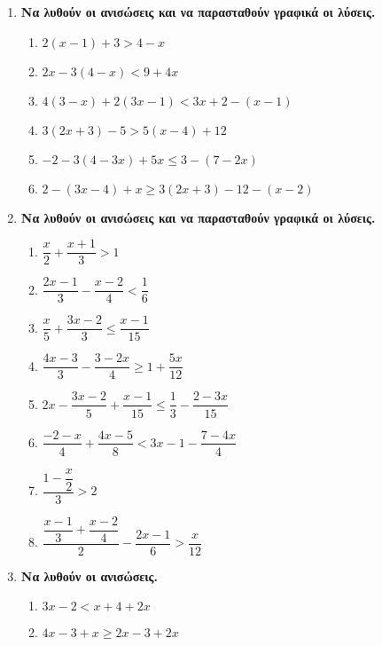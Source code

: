 \documentclass[twoside,nofonts,internet]{askhseis}
\begin{document}
\begin{enumerate}[label=\bf\textcolor{black}{{\large \arabic*.}},
itemsep=5mm]
\begin{multicols}{3}
\begin{enumerate}[label=\roman*.]
\item $ -x-4\geq7-3x+2 $
\item $ 7x-3+x<2x+9+5x $
\item $ -3x+8>4-5x+12 $
\end{enumerate}
\end{multicols}
\item \textbf{Να λυθούν οι ανισώσεις και να παρασταθούν γραφικά οι λύσεις.}
\begin{multicols}{2}
\begin{enumerate}[label=\roman*.]
\item $ 2(x-1)+3>4-x $
\item $ 2x-3(4-x)<9+4x $
\item $ 4(3-x)+2(3x-1)<3x+2-(x-1) $
\item $ 3(2x+3)-5>5(x-4)+12 $
\item $ -2-3(4-3x)+5x\leq3-(7-2x) $
\item $ 2-(3x-4)+x\geq3(2x+3)-12-(x-2) $
\end{enumerate}
\end{multicols}
\item \textbf{Να λυθούν οι ανισώσεις και να παρασταθούν γραφικά οι λύσεις.}
\begin{multicols}{2}
\begin{enumerate}[label=\roman*.]
\item $ \dfrac{x}{2}+\dfrac{x+1}{3}>1 $
\item $ \dfrac{2x-1}{3}-\dfrac{x-2}{4}<\dfrac{1}{6} $
\item $ \dfrac{x}{5}+\dfrac{3x-2}{3}\leq\dfrac{x-1}{15} $
\item $ \dfrac{4x-3}{3}-\dfrac{3-2x}{4}\geq1+\dfrac{5x}{12} $
\vfill
\columnbreak
\vfill
\item $ 2x-\dfrac{3x-2}{5}+\dfrac{x-1}{15}\leq\dfrac{1}{3}-\dfrac{2-3x}{15} $
\item $ \dfrac{-2-x}{4}+\dfrac{4x-5}{8}<3x-1-\dfrac{7-4x}{4} $
\item $ \dfrac{1-\dfrac{x}{2}}{3}>2 $
\item $ \dfrac{\dfrac{x-1}{3}+\dfrac{x-2}{4}}{2}-\dfrac{2x-1}{6}>\dfrac{x}{12} $
\end{enumerate}
\end{multicols}
\item \textbf{Να λυθούν οι ανισώσεις.}
\begin{multicols}{2}
\begin{enumerate}[label=\roman*.]
\item $ 3x-2<x+4+2x $
\item $ 4x-3+x\geq2x-3+2x $

\end{enumerate}
\end{multicols}
\end{enumerate}
\end{document}
